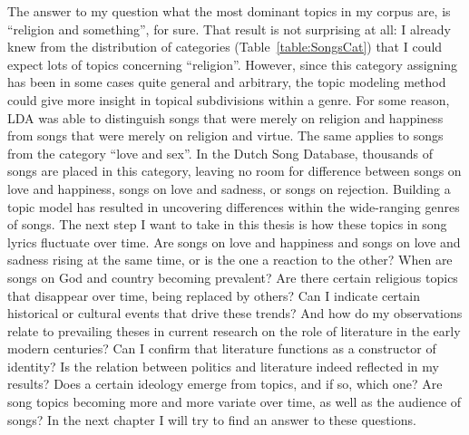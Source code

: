 The answer to my question what the most dominant topics in my corpus are, is \enquote{religion and something}, for sure. That result is not surprising at all: I already knew from the distribution of categories (Table~\ref{table:SongsCat}) that I could expect lots of topics concerning \enquote{religion}. However, since this category assigning has been in some cases quite general and arbitrary, the topic modeling method could give more insight in topical subdivisions within a genre. For some reason, LDA was able to distinguish songs that were merely on religion and happiness from songs that were merely on religion and virtue. The same applies to songs from the category \enquote{love and sex}. In the Dutch Song Database, thousands of songs are placed in this category, leaving no room for difference between songs on love and happiness, songs on love and sadness, or songs on rejection. Building a topic model has resulted in uncovering differences within the wide-ranging genres of songs. The next step I want to take in this thesis is how these topics in song lyrics fluctuate over time. Are songs on love and happiness and songs on love and sadness rising at the same time, or is the one a reaction to the other? When are songs on God and country becoming prevalent? Are there certain religious topics that disappear over time, being replaced by others? Can I indicate certain historical or cultural events that drive these trends? And how do my observations relate to prevailing theses in current research on the role of literature in the early modern centuries? Can I confirm that literature functions as a constructor of identity? Is the relation between politics and literature indeed reflected in my results? Does a certain ideology emerge from topics, and if so, which one? Are song topics becoming more and more variate over time, as well as the audience of songs? In the next chapter I will try to find an answer to these questions.




